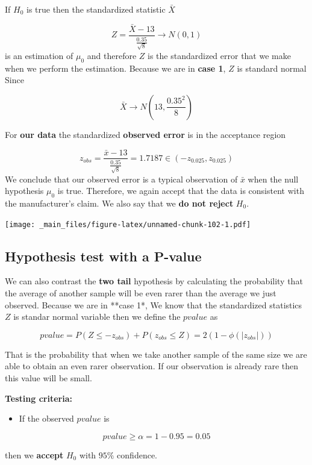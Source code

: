 \documentclass[
]{book}
\providecommand{\tightlist}{%
  \setlength{\itemsep}{0pt}\setlength{\parskip}{0pt}}
\begin{document}
If \(H_0\) is true then the standardized statistic \(\bar{X}\)

\[Z=\frac{\bar{X}-13}{\frac{0.35}{\sqrt{8}}}  \rightarrow N(0,1)\]
is an estimation of \(\mu_0\) and therefore \(Z\) is the standardized error that we make when we perform the estimation. Because we are in \textbf{case 1}, \(Z\) is standard normal
Since

\[\bar{X} \rightarrow N(13, \frac{0.35^2}{8})\]

For \textbf{our data} the standardized \textbf{observed error} is in the acceptance region

\[z_{obs}=\frac{\bar{x}-13}{\frac{0.35}{\sqrt{8}}}=1.7187 \in (-z_{0.025}, z_{0.025})\]
We conclude that our observed error is a typical observation of \(\bar{x}\) when the null hypothesis \(\mu_0\) is true. Therefore, we again accept that the data is consistent with the manufacturer's claim. We also say that we \textbf{do not reject} \(H_0\).

\texttt{[image: \_main\_files/figure-latex/unnamed-chunk-102-1.pdf]}

\hypertarget{hypothesis-test-with-a-p-value}{%
\subsection{Hypothesis test with a P-value}\label{hypothesis-test-with-a-p-value}}

We can also contrast the \textbf{two tail} hypothesis by calculating the probability that the average of another sample will be even rarer than the average we just observed. Because we are in **case 1*, We know that the standardized statistics \(Z\) is standar normal variable then we define the \(pvalue\) as

\[pvalue = P(Z \leq -z_{obs}) + P(z_{obs} \leq Z) = 2 (1-\phi(|z_{obs}|))\]

That is the probability that when we take another sample of the same size we are able to obtain an even rarer observation. If our observation is already rare then this value will be small.

\textbf{Testing criteria:}

\begin{itemize}
\tightlist
\item
  If the observed \(pvalue\) is
\end{itemize}

\[pvalue \geq \alpha =1-0.95=0.05\]

then we \textbf{accept} \(H_0\) with \(95\%\) confidence.
\end{document}
